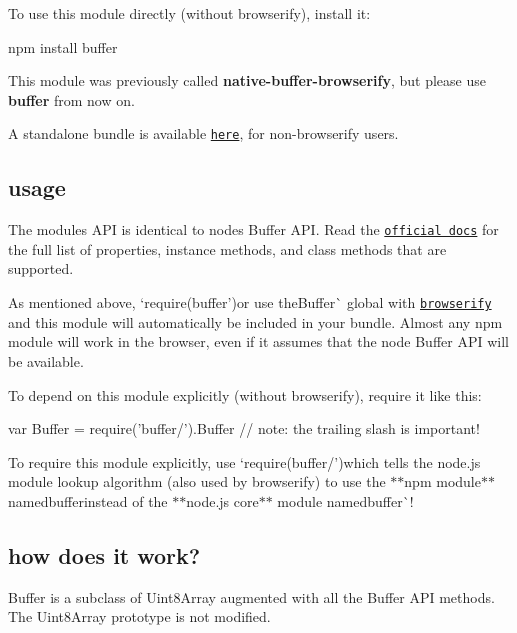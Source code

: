To use this module directly (without browserify), install it\+:


\begin{DoxyCode}
npm install buffer
\end{DoxyCode}


This module was previously called {\bfseries native-\/buffer-\/browserify}, but please use {\bfseries buffer} from now on.

A standalone bundle is available \href{https://wzrd.in/standalone/buffer}{\tt here}, for non-\/browserify users.

\subsection*{usage}

The module\textquotesingle{}s A\+PI is identical to node\textquotesingle{}s {\ttfamily Buffer} A\+PI. Read the \href{http://iojs.org/api/buffer.html}{\tt official docs} for the full list of properties, instance methods, and class methods that are supported.

As mentioned above, `require(\textquotesingle{}buffer'){\ttfamily or use the}Buffer\`{} global with \href{http://browserify.org}{\tt browserify} and this module will automatically be included in your bundle. Almost any npm module will work in the browser, even if it assumes that the node {\ttfamily Buffer} A\+PI will be available.

To depend on this module explicitly (without browserify), require it like this\+:


\begin{DoxyCode}
var Buffer = require('buffer/').Buffer  // note: the trailing slash is important!
\end{DoxyCode}


To require this module explicitly, use `require(\textquotesingle{}buffer/'){\ttfamily which tells the node.\+js module lookup algorithm (also used by browserify) to use the $\ast$$\ast$npm module$\ast$$\ast$ named}buffer{\ttfamily  instead of the $\ast$$\ast$node.js core$\ast$$\ast$ module named}buffer\`{}!

\subsection*{how does it work?}

{\ttfamily Buffer} is a subclass of {\ttfamily Uint8\+Array} augmented with all the {\ttfamily Buffer} A\+PI methods. The {\ttfamily Uint8\+Array} prototype is not modified.

